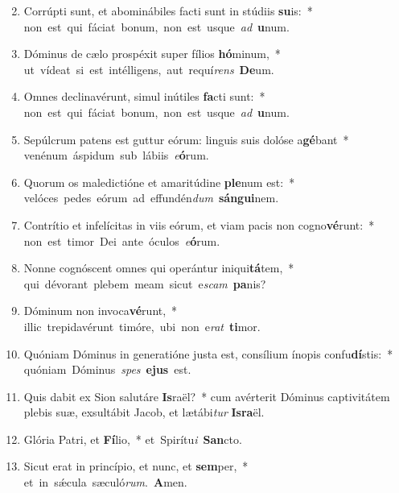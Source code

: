 \begin{flushleft}
\begin{enumerate}[leftmargin=*]
\setcounter{enumi}{1}
\item Corrúpti sunt, et abominábiles facti sunt in stúdiis \textbf{su}is:~* \mbox{non est qui fáciat bonum, non est usque {\it ad} \textbf{u}num.}
\item Dóminus de cælo prospéxit super fílios \textbf{hó}minum,~* \mbox{ut vídeat si est intélligens, aut requí{\it rens} \textbf{De}um.}
\item Omnes declinavérunt, simul inútiles \textbf{fa}cti sunt:~* \mbox{non est qui fáciat bonum, non est usque {\it ad} \textbf{u}num.}
\item Sepúlcrum patens est guttur eórum: linguis suis dolóse a\textbf{gé}bant~* \mbox{venénum áspidum sub lábiis {\it e}\textbf{ó}rum.}
\item Quorum os maledictióne et amaritúdine \textbf{ple}num est:~* \mbox{velóces pedes eórum ad effundén{\it dum} \textbf{sán}\textbf{gui}nem.}
\item Contrítio et infelícitas in viis eórum, et viam pacis non cogno\textbf{vé}runt:~* \mbox{non est timor Dei ante óculos {\it e}\textbf{ó}rum.}
\item Nonne cognóscent omnes qui operántur iniqui\textbf{tá}tem,~* \mbox{qui dévorant plebem meam sicut e{\it scam} \textbf{pa}nis?}
\item Dóminum non invoca\textbf{vé}runt,~* \mbox{illic trepidavérunt timóre, ubi non e{\it rat} \textbf{ti}mor.}
\item Quóniam Dóminus in generatióne justa est, consílium ínopis confu\textbf{dí}stis:~* \mbox{quóniam Dóminus {\it spes} \textbf{e}\textbf{jus} est.}
\item Quis dabit ex Sion salutáre \textbf{Is}raël?~* cum avérterit Dóminus captivitátem plebis suæ, exsultábit Jacob, et lætábi{\it tur} \textbf{Is}\textbf{ra}ël.
\item Glória Patri, et \textbf{Fí}lio,~* \mbox{et Spirítu{\it i} \textbf{San}cto.}
\item Sicut erat in princípio, et nunc, et \textbf{sem}per,~* \mbox{et in s\'{\ae}cula sæculó{\it rum}. \textbf{A}men.}\end{enumerate}
\end{flushleft}

